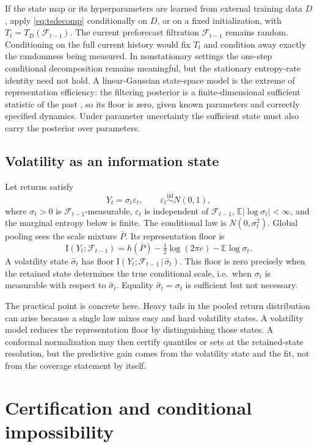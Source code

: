 \documentclass[11pt]{article}
\theoremstyle{remark}
\newcommand{\E}{\mathbb{E}}
\newcommand{\I}{\mathrm{I}}
\newcommand{\given}{\,|\,}
\newcommand{\F}{\mathcal{F}}
\begin{document}
If the state map or its hyperparameters are learned from external training data $D$, apply
\eqref{eq:tsdecomp} conditionally on $D$, or on a fixed initialization, with
$T_t=T_D(\F_{t-1})$. The current preforecast filtration $\F_{t-1}$ remains random.
Conditioning on the full current history would fix $T_t$ and condition away exactly the
randomness being measured. In nonstationary settings the one-step
conditional decomposition remains meaningful, but the stationary entropy-rate identity need not
hold. A linear-Gaussian state-space model is the extreme of representation efficiency: the
filtering posterior is a finite-dimensional sufficient statistic of the past
\citep{kalman1960new}, so its floor is zero, given known parameters and correctly specified
dynamics. Under parameter uncertainty the sufficient state must also carry the posterior over
parameters.

\subsection{Volatility as an information state}\label{sec:volatility}

Let returns satisfy
\[
Y_t=\sigma_t\varepsilon_t,\qquad \varepsilon_t\overset{\mathrm{iid}}{\sim}N(0,1),
\]
where $\sigma_t>0$ is $\F_{t-1}$-measurable, $\varepsilon_t$ is independent of
$\F_{t-1}$, $\E|\log\sigma_t|<\infty$, and the marginal entropy below is finite. The
conditional law is $N(0,\sigma_t^2)$. Global
pooling sees the scale mixture $\bar P$. Its representation floor is
\[
\I(Y_t;\F_{t-1})=h(\bar P)-\tfrac12\log(2\pi e)-\E\log\sigma_t .
\]
A volatility state $\hat\sigma_t$ has floor $\I(Y_t;\F_{t-1}\given\hat\sigma_t)$. This floor is
zero precisely when the retained state determines the true conditional scale, i.e.\ when
$\sigma_t$ is measurable with respect to $\hat\sigma_t$. Equality $\hat\sigma_t=\sigma_t$ is
sufficient but not necessary.

The practical point is concrete here. Heavy tails in the pooled return distribution
can arise because a single law mixes easy and hard volatility states. A volatility model reduces
the representation floor by distinguishing those states. A conformal normalization may then
certify quantiles or sets at the retained-state resolution, but the predictive gain comes from
the volatility state and the fit, not from the coverage statement by itself.

\section{Certification and conditional impossibility}\label{sec:certification}
\end{document}
